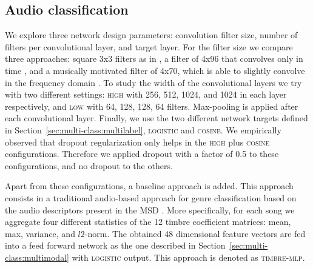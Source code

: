 \subsection{Audio classification}\label{sec:multi-class:audioexp}

We explore three network design parameters: convolution filter size, number of filters per convolutional layer, and target layer. 
For the filter size we compare three approaches: square 3x3 filters as in \cite{Choi2016}, a filter of 4x96 that convolves only in time \citep{Oord2013}, and a musically motivated filter of 4x70, which is able to slightly convolve in the frequency domain \citep{pons2016experimenting}. 
To study the width of the convolutional layers we try with two different settings: \textsc{high} with 256, 512, 1024, and 1024 in each layer respectively, and \textsc{low} with 64, 128, 128, 64 filters. %
Max-pooling is applied after each convolutional layer.
Finally, we use the two different network targets defined in Section~\ref{sec:multi-class:multilabel}, \textsc{logistic} and \textsc{cosine}. %
We empirically observed that dropout regularization only helps in the \textsc{high} plus \textsc{cosine} configurations. Therefore we applied dropout with a factor of 0.5 to these configurations, and no dropout to the others. %

Apart from these configurations, a baseline approach is added. This approach consists in a traditional audio-based approach for genre classification based on the audio descriptors present in the MSD \citep{Bertin-Mahieux2011}.
More specifically, for each song we aggregate four different statistics of the 12 timbre coefficient matrices: mean, max, variance, and $l2$-norm.
The obtained 48 dimensional feature vectors are fed into a feed forward network as the one described in Section~\ref{sec:multi-class:multimodal} with \textsc{logistic} output.
This approach is denoted as \textsc{timbre-mlp}.

